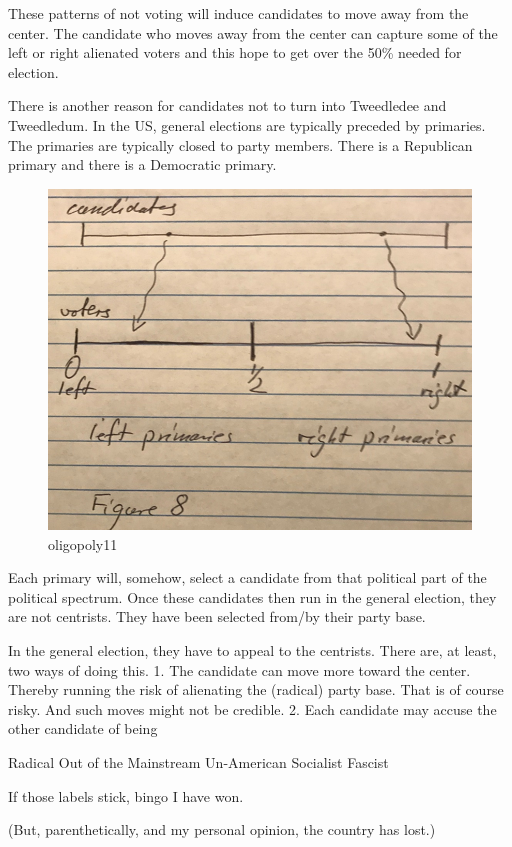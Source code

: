 \documentclass[
]{book}
\begin{document}
These patterns of not voting will induce candidates to move away from the center. The candidate who moves away from the center can capture some of the left or right alienated voters and this hope to get over the 50\% needed for election.

There is another reason for candidates not to turn into Tweedledee and Tweedledum. In the US, general elections are typically preceded by primaries. The primaries are typically closed to party members. There is a Republican primary and there is a Democratic primary.

\begin{figure}

{\centering \includegraphics[width=0.5\linewidth]{img/oligopoly/fig11} 

}

\caption{oligopoly11}\label{fig:oligopoly11}
\end{figure}

Each primary will, somehow, select a candidate from that political part of the political spectrum. Once these candidates then run in the general election, they are not centrists. They have been selected from/by their party base.

In the general election, they have to appeal to the centrists. There are, at least, two ways of doing this.
1. The candidate can move more toward the center. Thereby running the risk of alienating the (radical) party base. That is of course risky. And such moves might not be credible.
2. Each candidate may accuse the other candidate of being

\begin{center}
Radical
Out of the Mainstream
Un-American
Socialist
Fascist

\end{center}

If those labels stick, bingo I have won.

(But, parenthetically, and my personal opinion, the country has lost.)
\end{document}
